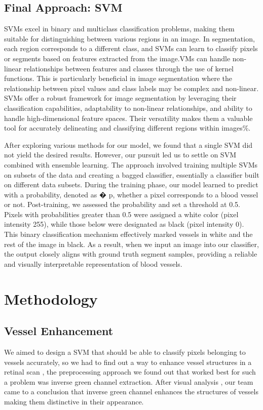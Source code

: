 \documentclass{article}
\begin{document}
\subsection{Final Approach: SVM}
SVMs excel in binary and multiclass classification problems, making them suitable for distinguishing between various regions in an image. In segmentation, each region corresponds to a different class, and SVMs can learn to classify pixels or segments based on features extracted from the image.VMs can handle non-linear relationships between features and classes through the use of kernel functions. This is particularly beneficial in image segmentation where the relationship between pixel values and class labels may be complex and non-linear.
SVMs offer a robust framework for image segmentation by leveraging their classification capabilities, adaptability to non-linear relationships, and ability to handle high-dimensional feature spaces. Their versatility makes them a valuable tool for accurately delineating and classifying different regions within images\%.\ 

After exploring various methods for our model, we found that a single SVM did not yield the desired results. However, our pursuit led us to settle on SVM combined with ensemble learning. The approach involved training multiple SVMs on subsets of the data and creating a bagged classifier, essentially a classifier built on different data subsets. During the training phase, our model learned to predict with a probability, denoted as 
�
p, whether a pixel corresponds to a blood vessel or not. Post-training, we assessed the probability and set a threshold at 0.5. Pixels with probabilities greater than 0.5 were assigned a white color (pixel intensity 255), while those below were designated as black (pixel intensity 0). This binary classification mechanism effectively marked vessels in white and the rest of the image in black. As a result, when we input an image into our classifier, the output closely aligns with ground truth segment samples, providing a reliable and visually interpretable representation of blood vessels.



\section{Methodology}
\subsection{Vessel Enhancement}
We aimed to design a SVM that should be able to classify pixels belonging to vessels accurately, so we had to find out a way to enhance vessel structures in a retinal scan , the preprocessing approach we found out that worked best for such a problem was inverse green channel extraction. After visual analysis , our team came to a conclusion that inverse green channel enhances the structures of vessels making them distinctive in their appearance.
\end{document}
